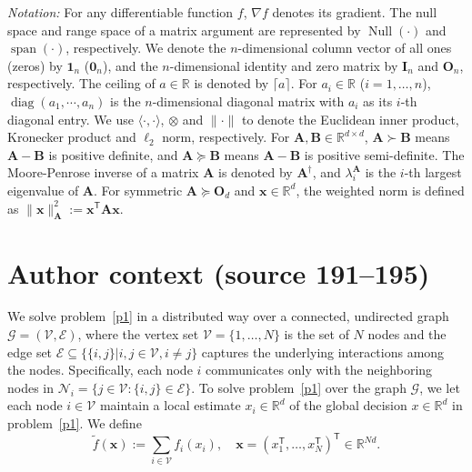 \documentclass[10pt,a4paper]{amsart}
\renewcommand{\Re}{{\mathbb{R}}}
\begin{document}
\emph{Notation:} For any differentiable function $f$, $\nabla f$ denotes its gradient. The null space and range space of a matrix argument are represented by $\operatorname{Null}(\cdot)$ and $\operatorname{span}(\cdot)$, respectively. We denote the $n$-dimensional column vector of all ones (zeros) by $\mathbf{1}_n$ ($\mathbf{0}_n$), and the $n$-dimensional identity and zero matrix by $\mathbf{I}_n$ and $\mathbf{O}_n$, respectively. The ceiling of $a\in\mathbb{R}$ is denoted by $\lceil a \rceil$. For $a_i\in \mathbb{R}$ ($i=1,\dots,n$), $\operatorname{diag}(a_1,\cdots,a_n)$ is the $n$-dimensional diagonal matrix with $a_i$ as its $i$-th diagonal entry. We use $\langle \cdot,\cdot \rangle$, $\otimes$ and $\|\cdot\|$ to denote the Euclidean inner product, Kronecker product and $\ell_2$ norm, respectively. For $\mathbf{A},\mathbf{B}\in \mathbb{R}^{d\times d}$, $\mathbf{A}\succ \mathbf{B}$ means $\mathbf{A}-\mathbf{B}$ is positive definite, and $\mathbf{A} \succeq \mathbf{B}$ means $\mathbf{A}-\mathbf{B}$ is positive semi-definite. The Moore-Penrose inverse of a matrix $\mathbf{A}$ is denoted by $\mathbf{A}^{\dagger}$, and $\lambda_i^\mathbf{A}$ is the $i$-th largest eigenvalue of $\mathbf{A}$. For symmetric $\mathbf{A} \succeq \mathbf{O}_d$ and $\mathbf{x}\in \mathbb{R}^d$, the weighted norm is defined as $\|\mathbf{x}\|^2_\mathbf{A}:=\mathbf{x}^{\mathsf{T}}\mathbf{A}\mathbf{x}$.


\section*{Author context (source 191--195)}

We solve problem~\eqref{p1} in a distributed way over a connected, undirected graph $\mathcal{G} = (\mathcal{V},\mathcal{E})$, where the vertex set $\mathcal{V} = \{1, \dots, N\}$ is the set of $N$ nodes and the edge set $\mathcal{E} \subseteq \{\{i,j\}|i,j \in \mathcal{V},i \neq j\}$ captures the underlying interactions among the nodes. Specifically, each node $i$ communicates only with the neighboring nodes in $\mathcal{N}_i=\{j\in\mathcal{V}:\{i,j\}\in\mathcal{E}\}$.
To solve problem~\eqref{p1} over the graph $\mathcal{G}$, we let each node $i \in \mathcal{V}$ maintain a local estimate $x_i \in \mathbb{R}^d$ of the global decision $x \in \mathbb{R}^d$ in problem~\eqref{p1}. We define 
\begin{equation}
\tilde{f}(\mathbf{x}) := \sum _{i \in \mathcal{V}} f_i(x_i),\quad \mathbf{x} = (x_1^{\mathsf{T}}, \dots, x_N^{\mathsf{T}})^{\mathsf{T}} \in \Re ^{Nd}.
\end{equation}
\end{document}
